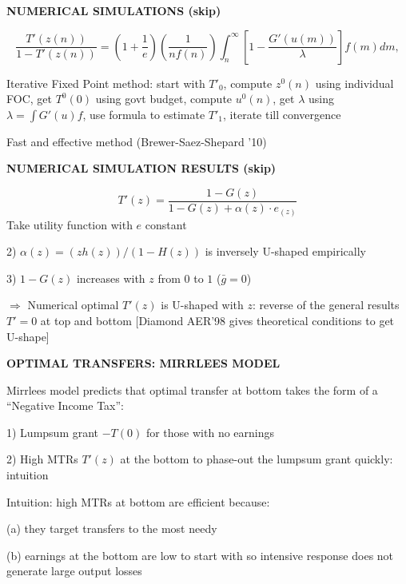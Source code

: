 \documentclass[landscape]{slides}
\begin{document}
\begin{slide}
\begin{center}
{\bf NUMERICAL SIMULATIONS (skip)}
\end{center}
$$\frac{T'(z(n))}{1-T'(z(n))} =\left ( 1+\frac{1}{e} \right ) \left
(\frac{1}{n f(n)} \right ) \int_n^{\infty} \left
[1-\frac{G'(u(m))}{\lambda} \right ] f(m)dm,$$

Iterative Fixed Point method: start with $T'_0$, compute $z^0(n)$
using individual FOC, get $T^0(0)$ using govt budget, compute
$u^0(n)$, get $\lambda$ using $\lambda=\int G'(u)f$, use formula
to estimate $T'_1$, iterate till convergence

Fast and effective method (Brewer-Saez-Shepard '10)
\end{slide}


\begin{slide}
\begin{center}
{\bf NUMERICAL SIMULATION RESULTS (skip)}
\end{center}
\[ T'(z) =\frac{1-G(z)}{1-G(z) + \alpha(z) \cdot e_{(z)} } \] Take utility
function with $e$ constant

2) $\alpha(z)=(z h(z))/(1-H(z))$ is inversely U-shaped empirically

3) $1-G(z)$ increases with $z$ from $0$ to $1$ ($\bar{g}=0$)

$\Rightarrow$ Numerical optimal $T'(z)$ is U-shaped with $z$:
reverse of the general results $T'=0$ at top and bottom [Diamond
AER'98 gives theoretical conditions to get U-shape]
\end{slide}

\begin{slide}

\end{slide}


\begin{slide}
\begin{center}
{\bf OPTIMAL TRANSFERS: MIRRLEES MODEL}
\end{center}
Mirrlees model predicts that optimal transfer at bottom takes the
form of a ``Negative Income Tax'':

1) Lumpsum grant $-T(0)$ for those with no earnings

2) High MTRs $T'(z)$ at the bottom to phase-out the lumpsum grant
quickly: intuition

Intuition: high MTRs at bottom are efficient because:

(a) they target transfers to the most needy

(b) earnings at the bottom are low to start with so intensive
response does not generate large output losses

\end{slide}
\end{document}
